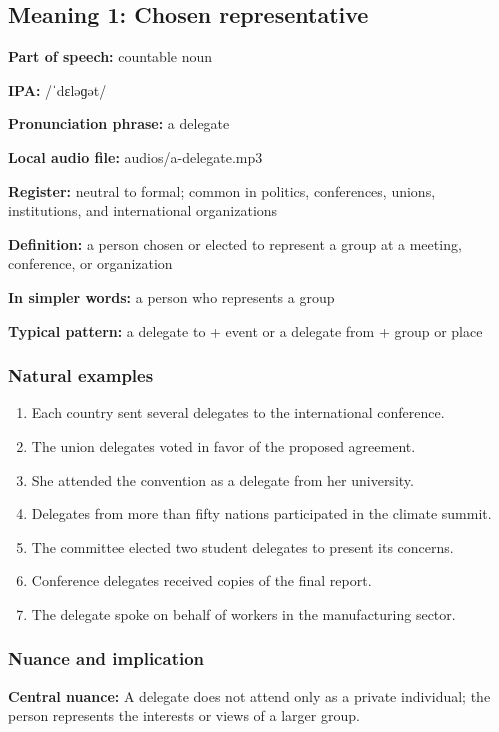 \documentclass[11pt]{article}
\begin{document}
\subsection{Meaning 1: Chosen representative}
\textbf{Part of speech:} countable noun

\textbf{IPA:} /ˈdɛləɡət/

\textbf{Pronunciation phrase:} a delegate

\textbf{Local audio file:} audios/a-delegate.mp3

\textbf{Register:} neutral to formal; common in politics, conferences, unions, institutions, and international organizations

\textbf{Definition:} a person chosen or elected to represent a group at a meeting, conference, or organization

\textbf{In simpler words:} a person who represents a group

\textbf{Typical pattern:} a delegate to + event or a delegate from + group or place

\subsubsection{Natural examples}
\begin{enumerate}
  \item Each country sent several delegates to the international conference.
  \item The union delegates voted in favor of the proposed agreement.
  \item She attended the convention as a delegate from her university.
  \item Delegates from more than fifty nations participated in the climate summit.
  \item The committee elected two student delegates to present its concerns.
  \item Conference delegates received copies of the final report.
  \item The delegate spoke on behalf of workers in the manufacturing sector.
\end{enumerate}

\subsubsection{Nuance and implication}
\textbf{Central nuance:} A delegate does not attend only as a private individual; the person represents the interests or views of a larger group.
\end{document}
